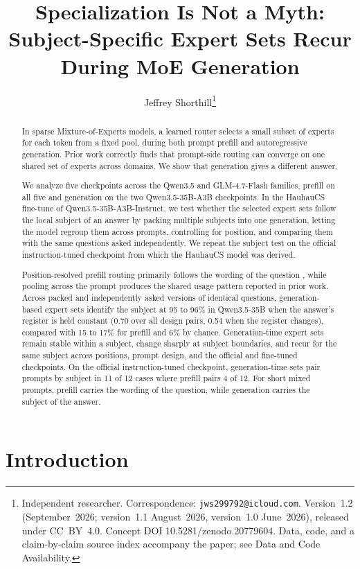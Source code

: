 \documentclass[10pt,twocolumn]{article}
\title{\textbf{Specialization Is Not a Myth:\\
Subject-Specific Expert Sets Recur During MoE Generation}}
\author{Jeffrey Shorthill\thanks{Independent researcher. Correspondence:
\texttt{jws299792@icloud.com}. Version~1.2 (September~2026; version~1.1
August~2026, version~1.0 June~2026), released under CC~BY~4.0. Concept DOI
10.5281/zenodo.20779604. Data, code, and a claim-by-claim source index
accompany the paper; see Data and Code Availability.}}
\date{}
\begin{document}
\maketitle

\begin{abstract}

In sparse Mixture-of-Experts models, a learned router selects a small subset of experts for each token from a fixed pool, during both prompt prefill and autoregressive generation. Prior work correctly finds that prompt-side routing can converge on one shared set of experts across domains. We show that generation gives a different answer.

We analyze five checkpoints across the Qwen3.5 and GLM-4.7-Flash families, prefill on all five and generation on the two Qwen3.5-35B-A3B checkpoints. In the HauhauCS fine-tune of Qwen3.5-35B-A3B-Instruct, we test whether the selected expert sets follow the local subject of an answer by packing multiple subjects into one generation, letting the model regroup them across prompts, controlling for position, and comparing them with the same questions asked independently. We repeat the subject test on the official instruction-tuned checkpoint from which the HauhauCS model was derived.

Position-resolved prefill routing primarily follows the wording of the question \citep{shorthill2026entropy}, while pooling across the prompt produces the shared usage pattern reported in prior work. Across packed and independently asked versions of identical questions, generation-based expert sets identify the subject at 95 to 96\% in Qwen3.5-35B when the answer's register is held constant (0.70 over all design pairs, 0.54 when the register changes), compared with 15 to 17\% for prefill and 6\% by chance. Generation-time expert sets remain stable within a subject, change sharply at subject boundaries, and recur for the same subject across positions, prompt design, and the official and fine-tuned checkpoints. On the official instruction-tuned checkpoint, generation-time sets pair prompts by subject in 11 of 12 cases where prefill pairs 4 of 12. For short mixed prompts, prefill carries the wording of the question, while generation carries the subject of the answer.

\end{abstract}

\section{Introduction}
\end{document}
